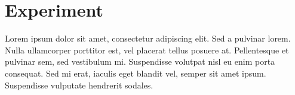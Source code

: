 \chapter{Experiment}
Lorem ipsum dolor sit amet, consectetur adipiscing elit. Sed a pulvinar lorem. Nulla ullamcorper porttitor est, vel placerat tellus posuere at. Pellentesque et pulvinar sem, sed vestibulum mi. Suspendisse volutpat nisl eu enim porta consequat. Sed mi erat, iaculis eget blandit vel, semper sit amet ipsum. Suspendisse vulputate hendrerit sodales.

